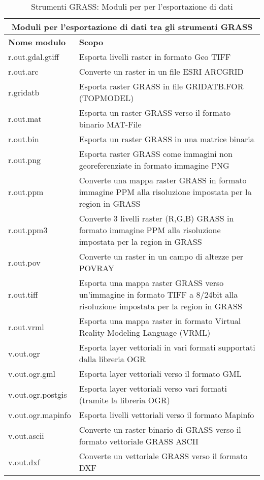 \begin{table}[ht]
\centering
\caption{Strumenti GRASS: Moduli per per l'esportazione di dati}\medskip
 \begin{tabular}{|p{4cm}|p{12cm}|}
  \hline \multicolumn{2}{|c|}{\textbf{Moduli per l'esportazione di dati tra gli strumenti GRASS}} \\ 
  \hline \textbf{Nome modulo} & \textbf{Scopo} \\
  \hline r.out.gdal.gtiff & Esporta livelli raster in formato Geo TIFF \\
  \hline r.out.arc & Converte un raster in un file ESRI ARCGRID \\
  \hline r.gridatb & Esporta raster GRASS in file GRIDATB.FOR (TOPMODEL) \\
  \hline r.out.mat & Esporta un raster GRASS verso il formato binario MAT-File \\
  \hline r.out.bin & Esporta un raster GRASS in una matrice binaria \\
  \hline r.out.png & Esporta raster GRASS come immagini non georeferenziate in formato immagine PNG \\
  \hline r.out.ppm & Converte una mappa raster GRASS in formato immagine PPM alla risoluzione impostata per la region in GRASS \\
  \hline r.out.ppm3 & Converte 3 livelli raster (R,G,B) GRASS in formato immagine PPM alla risoluzione impostata per la region in GRASS \\
  \hline r.out.pov & Converte un raster in un campo di altezze per POVRAY\\
  \hline r.out.tiff & Esporta una mappa raster GRASS verso un'immagine in formato TIFF a 8/24bit alla risoluzione impostata per la region in GRASS \\
  \hline r.out.vrml &  Esporta una mappa raster in formato Virtual Reality Modeling Language (VRML)\\
  \hline v.out.ogr & Esporta layer vettoriali in vari formati supportati dalla libreria OGR \\
  \hline v.out.ogr.gml & Esporta layer vettoriali verso il formato GML \\
  \hline v.out.ogr.postgis & Esporta layer vettoriali verso vari formati (tramite la libreria OGR) \\
  \hline v.out.ogr.mapinfo & Esporta livelli vettoriali verso il formato Mapinfo \\
  \hline v.out.ascii & Converte un raster binario di GRASS verso il formato vettoriale GRASS ASCII  \\
  \hline v.out.dxf & Converte un vettoriale GRASS verso il formato DXF  \\
\hline
\end{tabular}
\end{table}

